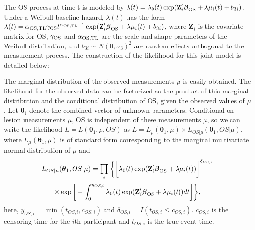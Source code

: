 The \ac{OS} process at time t is modeled by
$\lambda(t)=\lambda_0(t) \exp(\textbf{Z}_i' \boldsymbol{\beta}_{\rm OS}+\lambda \mu_{i}(t)+b_{3i})$.
Under a Weibull baseline hazard, $\lambda(t)$ has the form
$\lambda(t)=\alpha_{\rm OS,TL} \gamma_{\rm OS} t^{\alpha_{\rm OS,TL}-1} \exp(\textbf{Z}_i' \boldsymbol{\beta}_{\rm OS}+\lambda \mu_{i}(t)+b_{3i})$,
where $\textbf{Z}_i$ is the covariate matrix for OS, $\gamma_{\rm OS}$ and $\alpha_{\rm OS,TL}$ are the scale and shape parameters
of the Weibull distribution, and $b_{3i}\sim N(0,{\sigma_3})^2$ are random effects orthogonal to the measurement process. The construction of the likelihood for this joint model is detailed below:

The marginal distribution of the observed measurements $\mu$ is easily obtained. The likelihood for the observed data can be factorized as the product of this marginal distribution and the conditional distribution of OS, given the observed values of $\mu$. Let $\boldsymbol{\theta}_1$ denote the combined vector of unknown parameters. Conditional on lesion measurements $\mu$, OS is independent of these measurements $\mu$, so we can write the likelihood $L=L(\boldsymbol{\theta}_1, \mu, OS)$ as
$L=L_{\mu}(\boldsymbol{\theta}_1,\mu)  \times L_{OS| \mu}(\boldsymbol{\theta}_1,OS|\mu)
$,
where $L_{\mu}(\boldsymbol{\theta}_1,\mu)$ is of standard form corresponding to the marginal multivariate normal distribution of $\mu$ and
$$
L_{OS|\mu}(\boldsymbol{\theta}_1, OS|\mu)=\prod_i \bigg\{ \bigg[\lambda_0 (t) \exp(\textbf{Z}_i' \boldsymbol{\beta}_{\rm OS}+\lambda \mu_{i}(t)) \bigg]^{\delta_{OS,i}} 
$$
$$\times \exp \bigg[ -\int_0^{y_{OS,i}} \lambda_0(t) \exp(\textbf{Z}_i' \boldsymbol{\beta}_{\rm OS}+\lambda \mu_{i}(t))dt\bigg]\bigg\},
$$
here, $y_{OS,i}=\min(t_{OS,i},c_{OS,i})$ and $\delta_{OS,i}=I(t_{OS,i}\leq c_{OS,i})$. $c_{OS,i}$ is the censoring time for the $i$th participant and $t_{OS,i}$ is the true event time.


